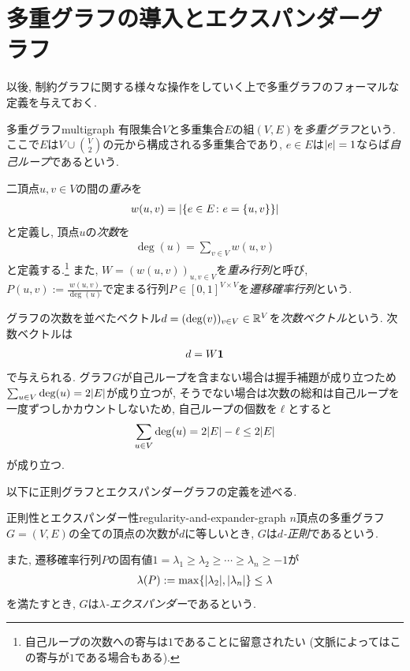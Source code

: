 \section{多重グラフの導入とエクスパンダーグラフ}

以後, 制約グラフに関する様々な操作をしていく上で多重グラフのフォーマルな定義を与えておく.

\begin{definition}{多重グラフ}{multigraph}
有限集合$V$と多重集合$E$の組$(V,E)$を\emph{多重グラフ}という.
ここで$E$は$V\cup \binom{V}{2}$の元から構成される多重集合であり, $e\in E$は$\abs{e}=1$ならば\emph{自己ループ}であるという.

二頂点$u,v\in V$の間の\emph{重み}を
\begin{align*}
  w(u,v) = \abs{\qty{e\in E \colon e = \{u,v\}}}
\end{align*}
と定義し, 頂点$u$の\emph{次数}を
\begin{align*}
  \deg(u) = \sum_{v\in V} w(u,v)
\end{align*}
と定義する.\footnote{自己ループの次数への寄与は$1$であることに留意されたい (文脈によってはこの寄与が$1$である場合もある).} また, $W=(w(u,v))_{u,v\in V}$を\emph{重み行列}と呼び, 
$P(u,v):=\frac{w(u,v)}{\deg(u)}$で定まる行列$P\in[0,1]^{V\times V}$を\emph{遷移確率行列}という.

\end{definition}

グラフの次数を並べたベクトル$d=(\deg(v))_{v\in V}\in \mathbb{R}^V$を\emph{次数ベクトル}という.
次数ベクトルは
\begin{align*}
  d = W\mathbf{1}
\end{align*}
で与えられる.
グラフ$G$が自己ループを含まない場合は握手補題が成り立つため$\sum_{u\in V}\deg(u) = 2\abs{E}$が成り立つが, そうでない場合は次数の総和は自己ループを一度ずつしかカウントしないため, 自己ループの個数を$\ell$とすると
\begin{align}
  \sum_{u\in V} \deg(u) = 2\abs{E} - \ell \le 2\abs{E} \label{eq:hand_shake_multigraph}
\end{align}
が成り立つ.


以下に正則グラフとエクスパンダーグラフの定義を述べる.

\begin{definition}{正則性とエクスパンダー性}{regularity-and-expander-graph}
  $n$頂点の多重グラフ$G=(V,E)$の全ての頂点の次数が$d$に等しいとき, $G$は\emph{$d$-正則}であるという.

  また, 遷移確率行列$P$の固有値$1=\lambda_1\ge \lambda_2\ge \cdots \ge \lambda_n \ge -1$が
  \begin{align*}
    \lambda(P):=\max\{\abs{\lambda_2}, \abs{\lambda_n}\} \le \lambda
  \end{align*}
  を満たすとき, $G$は\emph{$\lambda$-エクスパンダー}であるという.
\end{definition}

